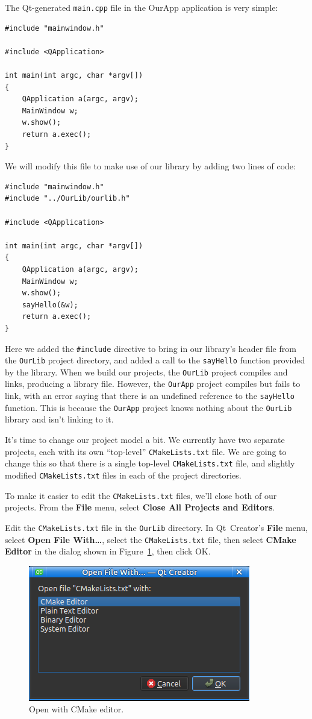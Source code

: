 \documentclass[letterpaper]{article}
\begin{document}
  The Qt-generated \verb|main.cpp| file in the OurApp application is very simple:
  \begin{lstlisting}
#include "mainwindow.h"

#include <QApplication>

int main(int argc, char *argv[])
{
    QApplication a(argc, argv);
    MainWindow w;
    w.show();
    return a.exec();
}
  \end{lstlisting}

  We will modify this file to make use of our library by adding two lines of code:
  \begin{lstlisting}
#include "mainwindow.h"
#include "../OurLib/ourlib.h"

#include <QApplication>

int main(int argc, char *argv[])
{
    QApplication a(argc, argv);
    MainWindow w;
    w.show();
    sayHello(&w);
    return a.exec();
}
  \end{lstlisting}

  Here we added the \verb|#include| directive to bring in our library's header file from the \verb|OurLib|
  project directory, and added a call to the \verb|sayHello| function provided by the library.
  When we build our projects, the \verb|OurLib| project compiles and links, producing a library file.
  However, the \verb|OurApp| project compiles but fails to link, with an error saying that there
  is an undefined reference to the \verb|sayHello| function. This is because the \verb|OurApp| project
  knows nothing about the \verb|OurLib| library and isn't linking to it.

  It's time to change our project model a bit. We currently have two separate projects,
  each with its own ``top-level'' \verb|CMakeLists.txt| file. We are going to change this
  so that there is a single top-level \verb|CMakeLists.txt| file, and slightly modified
  \verb|CMakeLists.txt| files in each of the project directories.

  To make it easier to edit the \verb|CMakeLists.txt| files, we'll close both of our projects.
  From the \textbf{File} menu, select \textbf{Close All Projects and Editors}.

  Edit the \verb|CMakeLists.txt| file in the \verb|OurLib| directory. In Qt~Creator's \textbf{File}
  menu, select \textbf{Open File With\ldots}, select the \verb|CMakeLists.txt| file, then select
  \textbf{CMake Editor} in the dialog shown in Figure~\ref{fig:open_with}, then click OK.
  \begin{figure}[H]
    \centering
    \includegraphics{open_with.png}
    \caption{Open with CMake editor.}
    \label{fig:open_with}
  \end{figure}
  
\end{document}

